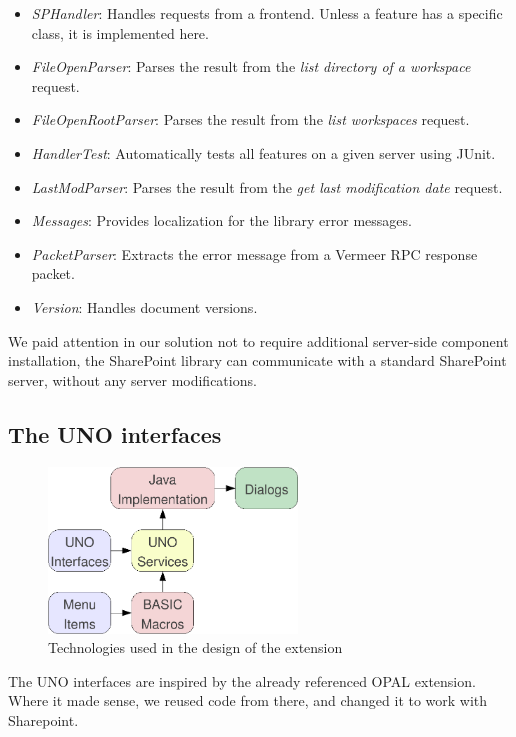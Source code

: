 \begin{itemize}
\item \emph{SPHandler}: Handles requests from a frontend. Unless a feature has a
specific class, it is implemented here.
\item \emph{FileOpenParser}: Parses the result from the \emph{list directory of
a workspace} request.
\item \emph{FileOpenRootParser}: Parses the result from the \emph{list
workspaces} request.
\item \emph{HandlerTest}: Automatically tests all features on a given server
using JUnit.
\item \emph{LastModParser}: Parses the result from the \emph{get last
modification date} request.
\item \emph{Messages}: Provides localization for the library error messages.
\item \emph{PacketParser}: Extracts the error message from a Vermeer
RPC \cite{vermeer} response packet.
\item \emph{Version}: Handles document versions.
\end{itemize}

We paid attention in our solution not to require additional server-side component
installation, the SharePoint library can communicate with a standard SharePoint
server, without any server modifications.

\subsection{The UNO interfaces}

\begin{figure}[H]
\centering
\includegraphics[width=250px,keepaspectratio]{design-technologies.pdf}
\caption{Technologies used in the design of the extension}
\label{fig:design-technologies}
\end{figure}

The UNO interfaces are inspired by the already referenced OPAL extension.
Where it made sense, we reused code from there, and changed it to work with
Sharepoint.

